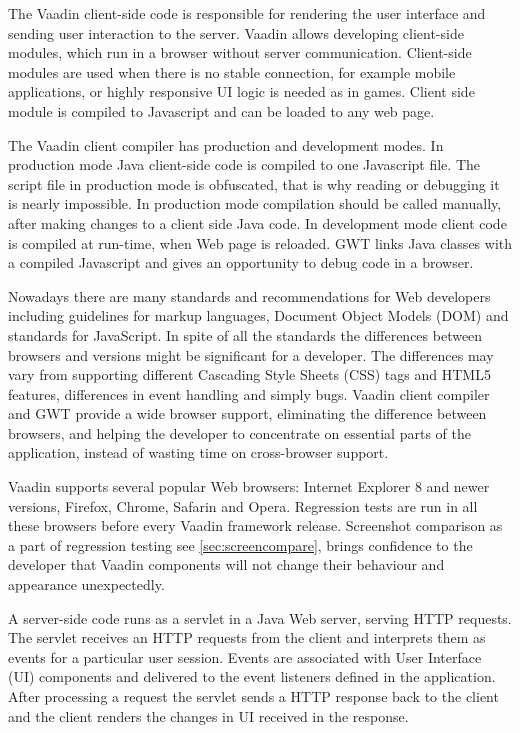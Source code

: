    The Vaadin client-side code is responsible for rendering the user interface and sending user
    interaction to the server. Vaadin allows developing client-side modules, 
    which run in a browser without server communication. Client-side modules are used when there is no stable
   connection, for example mobile applications, or highly responsive UI logic
   is needed as in games. Client side module is compiled to Javascript and can be
   loaded to any web page.
   
   The Vaadin client compiler has production and development modes. 
   In production mode Java  client-side code is compiled to one Javascript file. The script file in
   production mode is obfuscated, that is why reading or debugging it is nearly
   impossible. In production mode compilation should be called manually,
   after making changes to a client side Java code.
   In development mode client code is compiled at run-time, when Web page
   is reloaded. GWT links Java classes  with a compiled Javascript and gives
   an opportunity to debug code in a browser.
  
   Nowadays there are many standards and recommendations for Web
   developers including guidelines for
   markup languages, Document Object Models (DOM) and standards
   for JavaScript. In spite of all the standards the differences between
   browsers and versions might be significant for a developer. The differences may vary
   from supporting different Cascading Style Sheets (CSS) tags
   and HTML5 features, differences in event handling and simply bugs. Vaadin
   client compiler and GWT provide a wide browser support, eliminating the difference between browsers,
    and helping the
   developer to concentrate on essential parts of the application, instead of
   wasting time on cross-browser support. 
   
   Vaadin supports several popular Web browsers: Internet Explorer 8 and newer
   versions, Firefox, Chrome, Safarin and Opera. Regression tests are run
   in all these browsers before every Vaadin framework release. Screenshot
   comparison as a part of regression testing see \ref{sec:screencompare},
   brings confidence to the developer that Vaadin components will not change
   their behaviour and appearance unexpectedly.
   
   A server-side code runs as a servlet in a Java Web server, serving HTTP
   requests. The servlet receives an HTTP requests from the client and
   interprets them as events for a particular user session.
   Events are associated with User Interface (UI) components and delivered to
   the event listeners defined in the application. After processing a request
   the servlet sends a HTTP response back to the client and the client renders
   the changes in UI received in the response.
   
